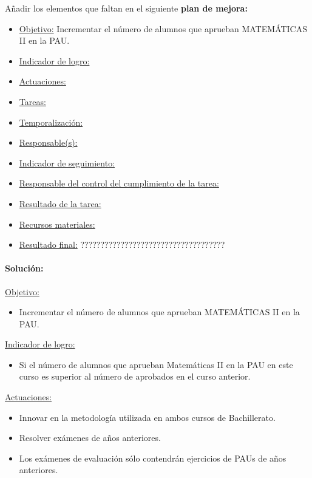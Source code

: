 {Añadir los elementos que faltan en el siguiente \textbf{plan de mejora:}

\begin{itemize}
\item  \ul{Objetivo:} Incrementar el número de alumnos que aprueban
\subitem MATEMÁTICAS II en la PAU.
\item  \ul{Indicador de logro:}
\item  \ul{Actuaciones:}
\item  \ul{Tareas:}
\item  \ul{Temporalizaci\'on:}
\item  \ul{Responsable(s):}
\item  \ul{Indicador de seguimiento:}
\item  \ul{Responsable del control del cumplimiento de la tarea:}
\item  \ul{Resultado de la tarea:}
\item  \ul{Recursos materiales:}
\item  \ul{Resultado final:} ????????????????????????????????????
\end{itemize}

\paragraph{Solución:}\mbox{}

\ul{Objetivo:}
\begin{itemize}
	\item Incrementar el número de alumnos que aprueban MATEMÁTICAS II en la PAU.
\end{itemize}


\ul{Indicador de logro:}
\begin{itemize}
	\item Si el número de alumnos que aprueban Matemáticas II en la PAU en este curso es superior al número de aprobados en el curso anterior.
\end{itemize}


\ul{Actuaciones:}
\vspace{-0.3cm}
\begin{itemize}
	\item Innovar en la metodología utilizada en ambos cursos de Bachillerato.

	\item Resolver exámenes de años anteriores.

	\item Los exámenes de evaluación sólo contendrán ejercicios de PAUs de años anteriores.


\end{itemize}}
